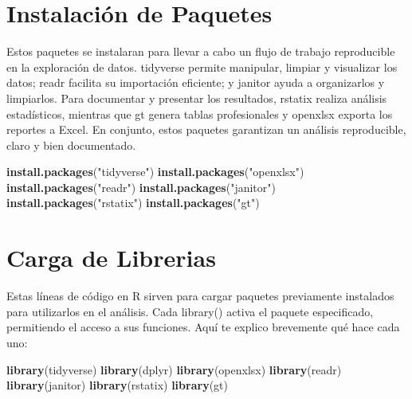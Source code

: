 \documentclass[
]{article}
\newenvironment{Shaded}{\begin{snugshade}}{\end{snugshade}}
\newcommand{\FunctionTok}[1]{\textcolor[rgb]{0.13,0.29,0.53}{\textbf{#1}}}
\newcommand{\NormalTok}[1]{#1}
\newcommand{\StringTok}[1]{\textcolor[rgb]{0.31,0.60,0.02}{#1}}
\begin{document}
\section{Instalación de Paquetes}\label{instalaciuxf3n-de-paquetes}

Estos paquetes se instalaran para llevar a cabo un flujo de trabajo
reproducible en la exploración de datos. tidyverse permite manipular,
limpiar y visualizar los datos; readr facilita su importación eficiente;
y janitor ayuda a organizarlos y limpiarlos. Para documentar y presentar
los resultados, rstatix realiza análisis estadísticos, mientras que gt
genera tablas profesionales y openxlsx exporta los reportes a Excel. En
conjunto, estos paquetes garantizan un análisis reproducible, claro y
bien documentado.

\begin{Shaded}
\begin{Highlighting}[]
\FunctionTok{install.packages}\NormalTok{(}\StringTok{"tidyverse"}\NormalTok{)}
\FunctionTok{install.packages}\NormalTok{(}\StringTok{"openxlsx"}\NormalTok{)}
\FunctionTok{install.packages}\NormalTok{(}\StringTok{"readr"}\NormalTok{)}
\FunctionTok{install.packages}\NormalTok{(}\StringTok{"janitor"}\NormalTok{)}
\FunctionTok{install.packages}\NormalTok{(}\StringTok{"rstatix"}\NormalTok{)}
\FunctionTok{install.packages}\NormalTok{(}\StringTok{"gt"}\NormalTok{)}
\end{Highlighting}
\end{Shaded}

\section{Carga de Librerias}\label{carga-de-librerias}

Estas líneas de código en R sirven para cargar paquetes previamente
instalados para utilizarlos en el análisis. Cada library() activa el
paquete especificado, permitiendo el acceso a sus funciones. Aquí te
explico brevemente qué hace cada uno:

\begin{Shaded}
\begin{Highlighting}[]
\FunctionTok{library}\NormalTok{(tidyverse)}
\FunctionTok{library}\NormalTok{(dplyr)}
\FunctionTok{library}\NormalTok{(openxlsx)}
\FunctionTok{library}\NormalTok{(readr)}
\FunctionTok{library}\NormalTok{(janitor)}
\FunctionTok{library}\NormalTok{(rstatix)}
\FunctionTok{library}\NormalTok{(gt)}
\end{Highlighting}
\end{Shaded}
\end{document}
